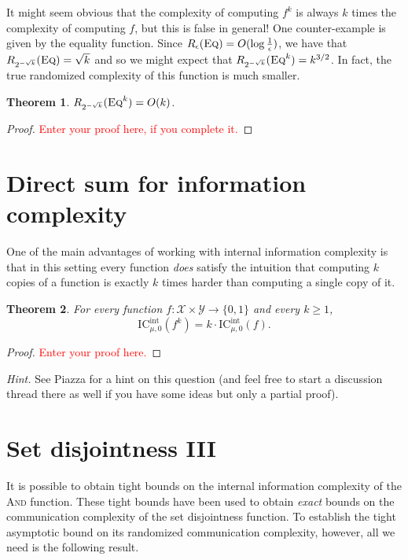 \documentclass[11pt]{amsart}
\theoremstyle{plain}
\newtheorem{theorem}{Theorem}
\theoremstyle{definition}
\theoremstyle{plain}
\newcommand{\calX}{\mathcal{X}}
\newcommand{\calY}{\mathcal{Y}}
\newcommand{\Eq}{\textsc{Eq}}
\newcommand{\ICint}{\mathrm{IC}^{\mathrm{int}}}
\newcommand{\replacethistext}[1]{\textcolor{red}{#1}}
\begin{document}
It might seem obvious that the complexity of computing $f^k$ is always $k$ times the complexity of computing $f$, but this is false in general! One counter-example is given by the equality function. Since $R_\epsilon(\Eq) = O(\log \frac1\epsilon)$, we have that $R_{2^{-\sqrt{k}}}(\Eq) = \sqrt{k}$ and so we might expect that $R_{2^{-\sqrt{k}}}(\Eq^k) = k^{3/2}$. In fact, the true randomized complexity of this function is much smaller.

\begin{theorem}
$R_{2^{-\sqrt{k}}}(\Eq^k) = O(k)$.
\end{theorem}

\begin{proof}
\replacethistext{Enter your proof here, if you complete it.}
\end{proof}


\newpage 
\section{Direct sum for information complexity}

One of the main advantages of working with internal information complexity is that in this setting every function \emph{does} satisfy the intuition that computing $k$ copies of a function is exactly $k$ times harder than computing a single copy of it.
\begin{theorem}
For every function $f : \calX \times \calY \to \{0,1\}$ and every $k \ge 1$,
\[
\ICint_{\mu,0}(f^k) = k \cdot \ICint_{\mu,0}(f).
\]
\end{theorem}

\begin{proof}
\replacethistext{Enter your proof here.}
\end{proof}

\bigskip
\noindent \emph{Hint.} See Piazza for a hint on this question (and feel free to start a discussion thread there as well if you have some ideas but only a partial proof).


\newpage 
\section{Set disjointness III}

It is possible to obtain tight bounds on the internal information complexity of the \textsc{And} function. These tight bounds have been used to obtain \emph{exact} bounds on the communication complexity of the set disjointness function. To establish the tight asymptotic bound on its randomized communication complexity, however, all we need is the following result.
\end{document}
